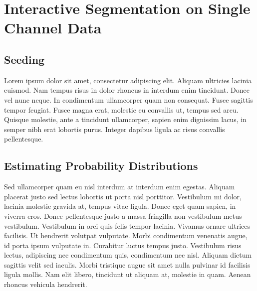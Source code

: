 
\chapter{Interactive Segmentation on Single Channel Data} %

\label{chap:Chapter3} %


\section{Seeding}

Lorem ipsum dolor sit amet, consectetur adipiscing elit. Aliquam ultricies lacinia euismod. Nam tempus risus in dolor rhoncus in interdum enim tincidunt. Donec vel nunc neque. In condimentum ullamcorper quam non consequat. Fusce sagittis tempor feugiat. Fusce magna erat, molestie eu convallis ut, tempus sed arcu. Quisque molestie, ante a tincidunt ullamcorper, sapien enim dignissim lacus, in semper nibh erat lobortis purus. Integer dapibus ligula ac risus convallis pellentesque.


\section{Estimating Probability Distributions}

Sed ullamcorper quam eu nisl interdum at interdum enim egestas. Aliquam placerat justo sed lectus lobortis ut porta nisl porttitor. Vestibulum mi dolor, lacinia molestie gravida at, tempus vitae ligula. Donec eget quam sapien, in viverra eros. Donec pellentesque justo a massa fringilla non vestibulum metus vestibulum. Vestibulum in orci quis felis tempor lacinia. Vivamus ornare ultrices facilisis. Ut hendrerit volutpat vulputate. Morbi condimentum venenatis augue, id porta ipsum vulputate in. Curabitur luctus tempus justo. Vestibulum risus lectus, adipiscing nec condimentum quis, condimentum nec nisl. Aliquam dictum sagittis velit sed iaculis. Morbi tristique augue sit amet nulla pulvinar id facilisis ligula mollis. Nam elit libero, tincidunt ut aliquam at, molestie in quam. Aenean rhoncus vehicula hendrerit.


